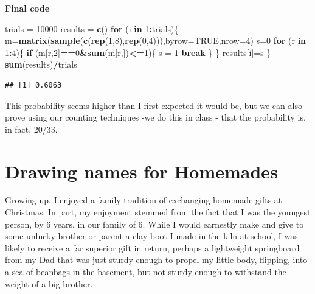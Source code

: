 \documentclass[
]{book}
\newenvironment{Shaded}{\begin{snugshade}}{\end{snugshade}}
\newcommand{\AttributeTok}[1]{\textcolor[rgb]{0.13,0.29,0.53}{#1}}
\newcommand{\ConstantTok}[1]{\textcolor[rgb]{0.56,0.35,0.01}{#1}}
\newcommand{\ControlFlowTok}[1]{\textcolor[rgb]{0.13,0.29,0.53}{\textbf{#1}}}
\newcommand{\DecValTok}[1]{\textcolor[rgb]{0.00,0.00,0.81}{#1}}
\newcommand{\FunctionTok}[1]{\textcolor[rgb]{0.13,0.29,0.53}{\textbf{#1}}}
\newcommand{\NormalTok}[1]{#1}
\newcommand{\OtherTok}[1]{\textcolor[rgb]{0.56,0.35,0.01}{#1}}
\newcommand{\SpecialCharTok}[1]{\textcolor[rgb]{0.81,0.36,0.00}{\textbf{#1}}}
\theoremstyle{definition}
\theoremstyle{definition}
\theoremstyle{definition}
\theoremstyle{definition}
\theoremstyle{remark}
\begin{document}
\textbf{Final code}

\begin{Shaded}
\begin{Highlighting}[]
\NormalTok{trials }\OtherTok{=} \DecValTok{10000}
\NormalTok{results }\OtherTok{=} \FunctionTok{c}\NormalTok{()}
\ControlFlowTok{for}\NormalTok{ (i }\ControlFlowTok{in} \DecValTok{1}\SpecialCharTok{:}\NormalTok{trials)\{}
\NormalTok{  m}\OtherTok{=}\FunctionTok{matrix}\NormalTok{(}\FunctionTok{sample}\NormalTok{(}\FunctionTok{c}\NormalTok{(}\FunctionTok{rep}\NormalTok{(}\DecValTok{1}\NormalTok{,}\DecValTok{8}\NormalTok{),}\FunctionTok{rep}\NormalTok{(}\DecValTok{0}\NormalTok{,}\DecValTok{4}\NormalTok{))),}\AttributeTok{byrow=}\ConstantTok{TRUE}\NormalTok{,}\AttributeTok{nrow=}\DecValTok{4}\NormalTok{)}
\NormalTok{  s}\OtherTok{=}\DecValTok{0}
  \ControlFlowTok{for}\NormalTok{ (r }\ControlFlowTok{in} \DecValTok{1}\SpecialCharTok{:}\DecValTok{4}\NormalTok{)\{}
    \ControlFlowTok{if}\NormalTok{ (m[r,}\DecValTok{2}\NormalTok{]}\SpecialCharTok{==}\DecValTok{0}\SpecialCharTok{\&}\FunctionTok{sum}\NormalTok{(m[r,])}\SpecialCharTok{\textless{}=}\DecValTok{1}\NormalTok{)\{}
\NormalTok{      s }\OtherTok{=} \DecValTok{1}
      \ControlFlowTok{break}
\NormalTok{    \}}
\NormalTok{  \}}
\NormalTok{  results[i]}\OtherTok{=}\NormalTok{s}
\NormalTok{\}}
\FunctionTok{sum}\NormalTok{(results)}\SpecialCharTok{/}\NormalTok{trials}
\end{Highlighting}
\end{Shaded}

\begin{verbatim}
## [1] 0.6063
\end{verbatim}

This probability seems higher than I first expected it would be, but we can also prove using our counting techniques -we do this in class - that the probability is, in fact, 20/33.

\section{Drawing names for Homemades}\label{drawing-names-for-homemades}

Growing up, I enjoyed a family tradition of exchanging homemade gifts at Christmas. In part, my enjoyment stemmed from the fact that I was the youngest person, by 6 years, in our family of 6. While I would earnestly make and give to some unlucky brother or parent a clay boot I made in the kiln at school, I was likely to receive a far superior gift in return, perhaps a lightweight springboard from my Dad that was just sturdy enough to propel my little body, flipping, into a sea of beanbags in the basement, but not sturdy enough to withstand the weight of a big brother.
\end{document}
